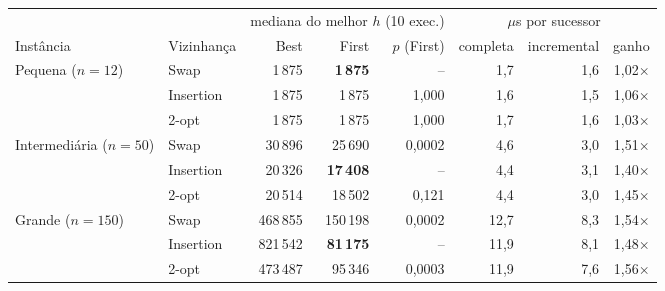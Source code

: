 \begin{tabular}{llrrrrrr}
\toprule
 & & \multicolumn{3}{c}{mediana do melhor $h$ (10 exec.)} & \multicolumn{3}{c}{$\mu$s por sucessor} \\
\cmidrule(lr){3-5}\cmidrule(lr){6-8}
Instância & Vizinhança & Best & First & $p$ (First) & completa & incremental & ganho \\
\midrule
Pequena ($n=12$) & Swap & 1\,875 & \textbf{1\,875} & -- & 1,7 & 1,6 & 1,02$\times$ \\
 & Insertion & 1\,875 & 1\,875 & 1,000 & 1,6 & 1,5 & 1,06$\times$ \\
 & 2-opt & 1\,875 & 1\,875 & 1,000 & 1,7 & 1,6 & 1,03$\times$ \\
\midrule
Intermediária ($n=50$) & Swap & 30\,896 & 25\,690 & 0,0002 & 4,6 & 3,0 & 1,51$\times$ \\
 & Insertion & 20\,326 & \textbf{17\,408} & -- & 4,4 & 3,1 & 1,40$\times$ \\
 & 2-opt & 20\,514 & 18\,502 & 0,121 & 4,4 & 3,0 & 1,45$\times$ \\
\midrule
Grande ($n=150$) & Swap & 468\,855 & 150\,198 & 0,0002 & 12,7 & 8,3 & 1,54$\times$ \\
 & Insertion & 821\,542 & \textbf{81\,175} & -- & 11,9 & 8,1 & 1,48$\times$ \\
 & 2-opt & 473\,487 & 95\,346 & 0,0003 & 11,9 & 7,6 & 1,56$\times$ \\
\bottomrule
\end{tabular}
